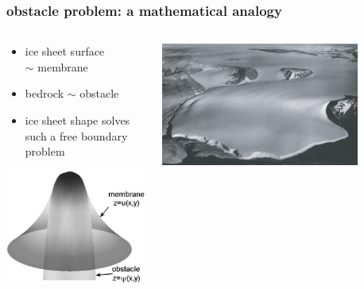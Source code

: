 \documentclass[10pt,hyperref={pdfpagelabels=true}]{beamer}
\begin{document}
\begin{frame}
  \frametitle{obstacle problem: a mathematical analogy}

\begin{columns}
\begin{column}{0.35\textwidth}
\begin{itemize}
\item ice sheet surface \\ $\sim$ \alert{membrane}
\item bedrock $\sim$ \alert{obstacle}
\item ice sheet shape solves such a \alert{free boundary problem}
\end{itemize}
\vfill
\begin{center}
\includegraphics[width=1.0\textwidth]{classicalobs}
\end{center}
\end{column}
\begin{column}{0.65\textwidth}
\begin{center}
\includegraphics[width=0.8\textwidth]{polaris} \\

\end{center}
\end{column}
\end{columns}
\end{frame}
\end{document}
